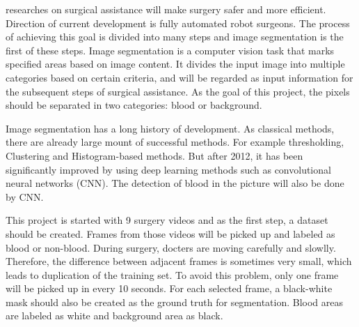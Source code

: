 \documentclass[10pt,journal,compsoc]{IEEEtran}
\begin{document}
% 
% 
% 
% 
 researches on surgical assistance will make surgery safer and more efficient.
Direction of current \linebreak development is fully automated robot surgeons. 
The process of achieving this goal is divided into many steps and image segmentation is the first of these steps. 
Image segmentation is a computer vision task that marks specified areas based on image content. 
It divides the input image into multiple categories based on certain criteria, and will be regarded as input information for the subsequent steps of surgical assistance.
As the goal of this project, the pixels should be separated in two categories: blood or background.
\par
Image segmentation has a long history of development. 
As classical methods, there are already large mount of \linebreak successful methods. For example thresholding\cite{cherietThresholding}, \linebreak Clustering\cite{colemanClustering} and Histogram-based\cite{tobiasHistogramThresholding} methods.
But after 2012, it has been significantly improved by using deep learning methods such as convolutional neural networks (CNN).
The detection of blood in the picture will also be done by CNN.
\par
This project is started with 9 surgery videos and as the first step, a dataset should be created. 
Frames from those videos will be picked up and labeled as blood or \linebreak non-blood.
During surgery, docters are moving carefully and slowlly. 
Therefore, the difference between adjacent frames is sometimes very small, which leads to duplication of the training set.
To avoid this problem, only one frame will be picked up in every 10 seconds.
For each selected frame, a black-white mask should also be created as the ground truth for segmentation. Blood areas are labeled as white and background area as black.
\end{document}
